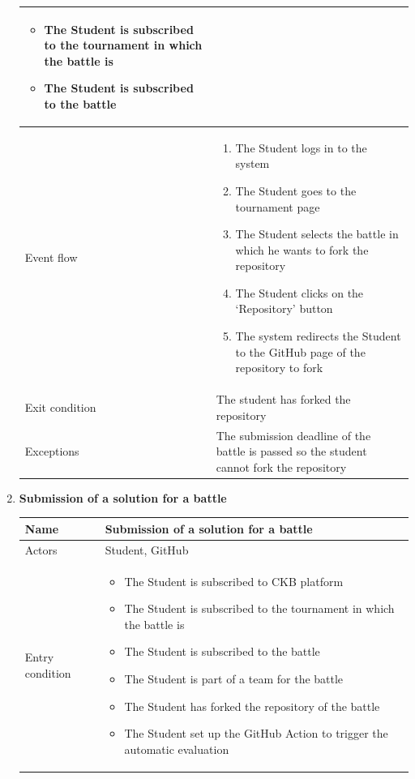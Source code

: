 \begin{enumerate}[label=UC\arabic*:]
\begin{tabular}{|p{3cm}|p{8cm}|}
\begin{itemize}
            \item The Student is subscribed to the tournament in which the battle is
            \item The Student is subscribed to the battle
        \end{itemize} \\
        \hline
        Event flow &
        \begin{enumerate}[label=\arabic*.]
            \item The Student logs in to the system
            \item The Student goes to the tournament page
            \item The Student selects the battle in which he wants to fork the repository
            \item The Student clicks on the `Repository' button
            \item The system redirects the Student to the GitHub page of the repository to fork
        \end{enumerate} \\
        \hline
        Exit condition & The student has forked the repository \\
        \hline
        Exceptions & The submission deadline of the battle is passed so the student cannot fork the repository \\
        \hline
    \end{tabular}
    \item \textbf{Submission of a solution for a battle} \\
    \begin{tabular}{|p{3cm}|p{8cm}|}
        \hline
        Name & Submission of a solution for a battle \\
        \hline
        Actors & Student, GitHub \\
        \hline
        Entry condition &
        \begin{itemize}
            \item The Student is subscribed to CKB platform
            \item The Student is subscribed to the tournament in which the battle is
            \item The Student is subscribed to the battle
            \item The Student is part of a team for the battle
            \item The Student has forked the repository of the battle
            \item The Student set up the GitHub Action to trigger the automatic evaluation

\end{itemize}
\end{tabular}
\end{enumerate}
